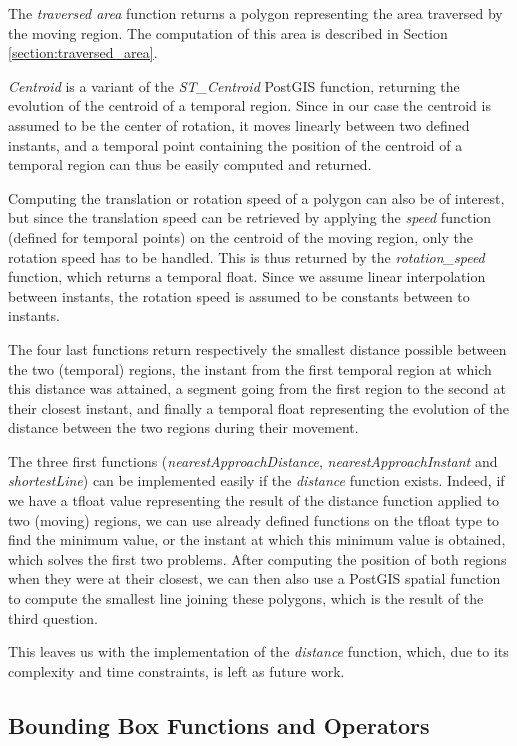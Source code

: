 The \textit{traversed area} function returns a polygon representing the area traversed by the moving region. The computation of this area is described in Section \ref{section:traversed_area}.

\textit{Centroid} is a variant of the \textit{ST\_Centroid} PostGIS function, returning the evolution of the centroid of a temporal region. Since in our case the centroid is assumed to be the center of rotation, it moves linearly between two defined instants, and a temporal point containing the position of the centroid of a temporal region can thus be easily computed and returned.

Computing the translation or rotation speed of a polygon can also be of interest, but since the translation speed can be retrieved by applying the \textit{speed} function (defined for temporal points) on the centroid of the moving region, only the rotation speed has to be handled. This is thus returned by the \textit{rotation\_speed} function, which returns a temporal float. Since we assume linear interpolation between instants, the rotation speed is assumed to be constants between to instants.

The four last functions return respectively the smallest distance possible between the two (temporal) regions, the instant from the first temporal region at which this distance was attained, a segment going from the first region to the second at their closest instant, and finally a temporal float representing the evolution of the distance between the two regions during their movement. 

The three first functions (\textit{nearestApproachDistance}, \textit{nearestApproachInstant} and \textit{shortestLine}) can be implemented easily if the \textit{distance} function exists. Indeed, if we have a tfloat value representing the result of the distance function applied to two (moving) regions, we can use already defined functions on the tfloat type to find the minimum value, or the instant at which this minimum value is obtained, which solves the first two problems. After computing the position of both regions when they were at their closest, we can then also use a PostGIS spatial function to compute the smallest line joining these polygons, which is the result of the third question.

This leaves us with the implementation of the \textit{distance} function, which, due to its complexity and time constraints, is left as future work.

\subsection{Bounding Box Functions and Operators}
\label{section:bbox_funcs}

